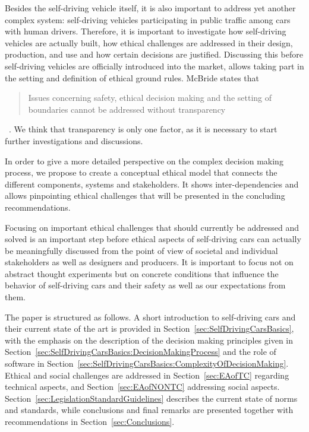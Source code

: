 Besides the self-driving vehicle itself, it is also important to address  yet another complex system: self-driving vehicles participating in public traffic among cars with human drivers. Therefore, it is important to investigate how self-driving vehicles are actually built, how ethical challenges are addressed in their design, production, and use and how certain decisions are justified. Discussing this before self-driving vehicles are officially introduced into the market, allows taking part in the setting and definition of ethical ground rules. McBride states that \blockquote{Issues concerning safety, ethical decision making and the setting of boundaries cannot be addressed without transparency}~\cite{McBride:2016:EDC:2874239.2874265}. We think that transparency is only one factor, as it is necessary to start further investigations and discussions. 

In order to give a more detailed perspective on the complex decision making process, we propose to create a conceptual ethical model that connects the different components, systems and stakeholders. It shows inter-dependencies and allows pinpointing ethical challenges that will be presented in the concluding recommendations.

Focusing on important ethical challenges that should currently be addressed and solved is an important step before ethical aspects of self-driving cars can actually be meaningfully discussed from the point of view of societal and individual stakeholders as well as designers and producers. It is important to focus not on abstract thought experiments but on concrete conditions that influence the behavior of self-driving cars and their safety as well as our expectations from them.

The paper is structured as follows. A short introduction to self-driving cars and their current state of the art is provided in Section~\ref{sec:SelfDrivingCarsBasics}, with the emphasis on the description of the decision making principles given in Section~\ref{sec:SelfDrivingCarsBasics:DecisionMakingProcess} and the role of software in Section~\ref{sec:SelfDrivingCarsBasics:ComplexityOfDecisionMaking}. Ethical and social challenges are addressed in Section~\ref{sec:EAofTC} regarding technical aspects, and Section~\ref{sec:EAofNONTC} addressing social aspects. Section~\ref{sec:LegislationStandardGuidelines} describes the current state of norms and standards, while conclusions and final remarks are  presented together with recommendations in Section~\ref{sec:Conclusions}.


